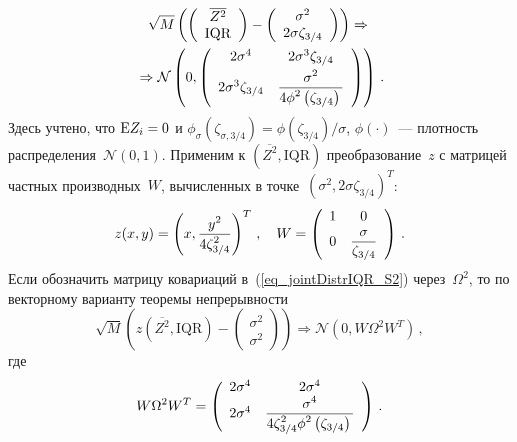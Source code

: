 \begin{multicols}{2}
\noindent
\begin{multline}
\label{eq_jointDistrIQR_S2}
\sqrt{M}\left(\left(\begin{array}{c}\overline{Z^2}\\\mathrm{IQR}\end{array}\right)-
\left(
\begin{array}{c}
\sigma^2\\2\sigma\zeta_{3/4}\end{array}
\right)\right)
\Rightarrow{}\\
{}\Rightarrow  \mathcal{N}
\left(0,\left(
\begin{array}{cc} 2\sigma^4 & 2\sigma^3\zeta_{3/4} \\[3pt]
2\sigma^3\zeta_{3/4} & 
\displaystyle\displaystyle\frac{\displaystyle \sigma^2\mathstrut}{\displaystyle 4\phi^2\left(\zeta_{3/4}\right)\mathstrut} \end{array}
\right)\right)\,.
\end{multline}
Здесь учтено, что $\textrm{E} Z_i=0$ и $\phi_\sigma\left(\zeta_{\sigma,3/4}\right)=
\phi\left(\zeta_{3/4}\right)/\sigma$, $\phi(\cdot)$~--- плотность распределения~$\mathcal{N}(0,1)$. 
Применим к $\left(\overline{Z^2},\mathrm{IQR}\right)$ преобразование~$z$ с матрицей частных производных~$W$, вычисленных в
точ\-ке~$\left(\sigma^2, 2\sigma\zeta_{3/4}\right)^T$:
\begin{equation*}
z(x,y)=\left(x,\displaystyle\frac{\displaystyle y^2\mathstrut}{\displaystyle 4\zeta^2_{3/4}\mathstrut}\right)^T\,, 
\quad W=\left(
\begin{array}{cc}
1 & 0\\0 & \displaystyle\displaystyle\frac{\displaystyle \sigma\mathstrut}{\displaystyle \zeta_{3/4}\mathstrut}
\end{array}\right)\,.
\end{equation*}
Если обозначить матрицу ковариаций в~(\ref{eq_jointDistrIQR_S2}) через~$\Omega^2$, то 
по векторному варианту теоремы непрерывности
\begin{equation*}
\sqrt{M}\left(z\left(\overline{Z^2},\mathrm{IQR}\right)-\left(\begin{array}{c}\sigma^2\\\sigma^2\end{array}\right)\right)
\Rightarrow \mathcal{N}\left(0,W\Omega^2W^T\right)\,,
\end{equation*}
где
\begin{equation*}
W\Omega^2W^T=\left(\begin{array}{cc} 2\sigma^4 & 2\sigma^4 \\ 2\sigma^4 & \displaystyle\frac{\displaystyle \sigma^4\mathstrut}{\displaystyle 4\zeta_{3/4}^2\phi^2\left(\zeta_{3/4}\right)\mathstrut} 
\end{array}\right)\,.
\end{equation*}

\end{multicols}
